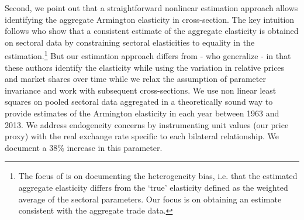 \documentclass[12pt,twoside,a4paper,notitlepage]{article}
\begin{document}
Second, we point out that a straightforward nonlinear estimation approach allows identifying the aggregate Armington elasticity in cross-section. The key intuition follows \cite{Imbs2015} who show that a consistent estimate of the aggregate elasticity is obtained on sectoral data by constraining sectoral elasticities to equality in the estimation.\footnote{The focus of \cite{Imbs2015} is on documenting the heterogeneity bias, i.e. that the estimated aggregate elasticity differs from the `true' elasticity defined as the weighted average of the sectoral parameters. 
Our focus is on obtaining an estimate consistent with the aggregate trade data.} But our estimation approach differs from \cite{Imbs2015} - who generalize \cite{Feenstra1994} - in that these authors identify the elasticity while using the variation in relative prices and market shares over time while we relax the assumption of parameter invariance and work with subsequent cross-sections. 
We use non linear least squares on pooled sectoral data aggregated in a theoretically sound way to provide estimates of the Armington elasticity in each year between 1963 and 2013. 
We address endogeneity concerns by instrumenting unit values (our price proxy) with the real exchange rate specific to each bilateral relationship.
We document a 38\% increase in this parameter. 
\end{document}
